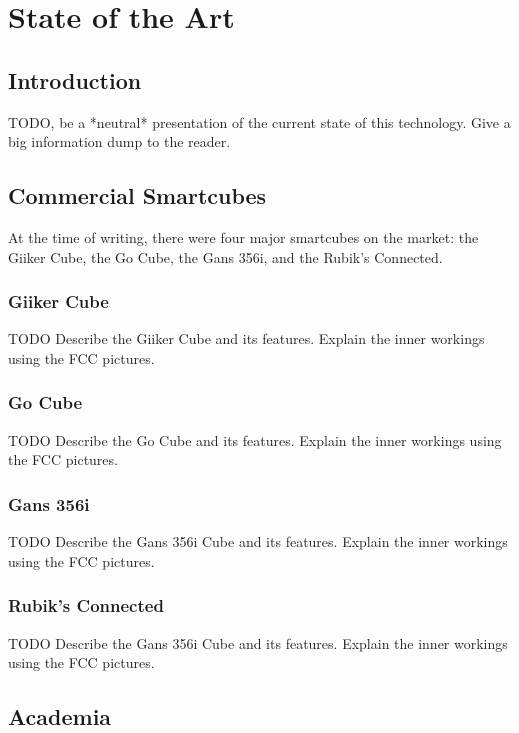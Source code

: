 
\chapter{State of the Art} %

\label{Chapter3} %


\section{Introduction}

TODO, be a *neutral* presentation of the current state of this technology. Give a big information dump to the reader.


\section{Commercial Smartcubes}

At the time of writing, there were four major smartcubes on the market: the Giiker Cube, the Go Cube, the Gans 356i, and the Rubik's Connected.

\subsection{Giiker Cube}
TODO Describe the Giiker Cube and its features. Explain the inner workings using the FCC pictures.

\subsection{Go Cube}
TODO Describe the Go Cube and its features. Explain the inner workings using the FCC pictures.

\subsection{Gans 356i}
TODO Describe the Gans 356i Cube and its features. Explain the inner workings using the FCC pictures.

\subsection{Rubik's Connected}
TODO Describe the Gans 356i Cube and its features. Explain the inner workings using the FCC pictures.


\section{Academia}

